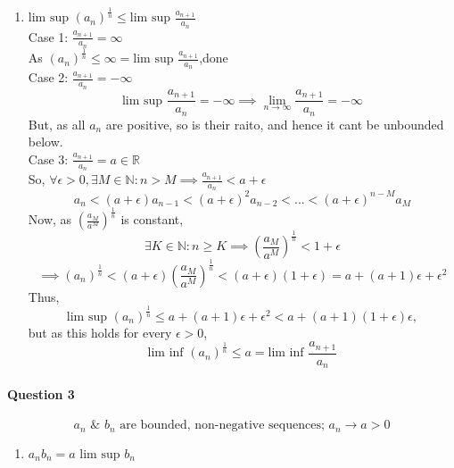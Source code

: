 \documentclass[20pt]{extarticle} %
\begin{document}
\begin{enumerate}[label=\Roman*]
	\item $\text{lim sup }(a_n)^\frac{1}{n} \leq \text{lim sup }\frac{a_{n+1}}{a_n}$\\
		Case 1:  $ \frac{a_{n+1}}{a_n}=\infty $\\
		As $(a_n)^ \frac{1}{n} \leq \infty = \text{lim sup }\frac{a_{n+1}}{a_n}$,done\\

		Case 2:  $ \frac{a_{n+1}}{a_n}= -\infty $\\
		\[ \text{lim sup }  \frac{a_{n+1}}{a_n}= -\infty \implies \lim_{n \to \infty} \frac{a_{n+1}}{a_n} = -\infty\]
		But, as all $a_n$ are positive, so is their raito, and hence it cant be unbounded below. \\

		Case 3:  $ \frac{a_{n+1}}{a_n}= a \in \mathbb{R} $\\
		So, $ \forall \epsilon > 0,  \exists M \in \mathbb{N}: n > M \implies \frac{a_{n+1}}{a_n} < a+\epsilon$
		\[ a_n<(a+\epsilon) a_{n-1}<(a+\epsilon)^2 a_{n-2}<...<(a+\epsilon)^{n-M} a_M \]
		Now, as $(\frac{a_M}{a^M})^{ \frac{1}{n} }$ is constant,
		\[   	\exists K \in \mathbb{N}: n \geq K \implies  (\frac{a_M}{a^M})^{ \frac{1}{n} } <1+\epsilon\]
		\[ \implies (a_n)^ \frac{1}{n}<(a+ \epsilon) (\frac{a_M}{a^M})^{ \frac{1}{n} } < (a+\epsilon)(1+\epsilon)=a+(a+1)\epsilon + \epsilon^2 \]
		Thus,
		\[\text{lim sup }(a_n)^ \frac{1}{n} \leq a+(a+1) \epsilon + \epsilon^2<a+(a+1)(1+\epsilon)\epsilon, \]
	but as this holds for every $\epsilon>0$,
		\[ \text{lim inf }(a_n)^ \frac{1}{n} \leq a= \text{lim inf } \frac{a_{n+1}}{a_n}  \]

\end{enumerate}

\paragraph{Question 3}
\[\text{ $a_n$ & $b_n$ are bounded, non-negative sequences; $a_n \rightarrow a >0 $   } \]
\begin{enumerate}[label=\Roman*]
	\item {}$a_n b_n = a \text{ lim sup }b_n$

\end{enumerate}
\end{document}
